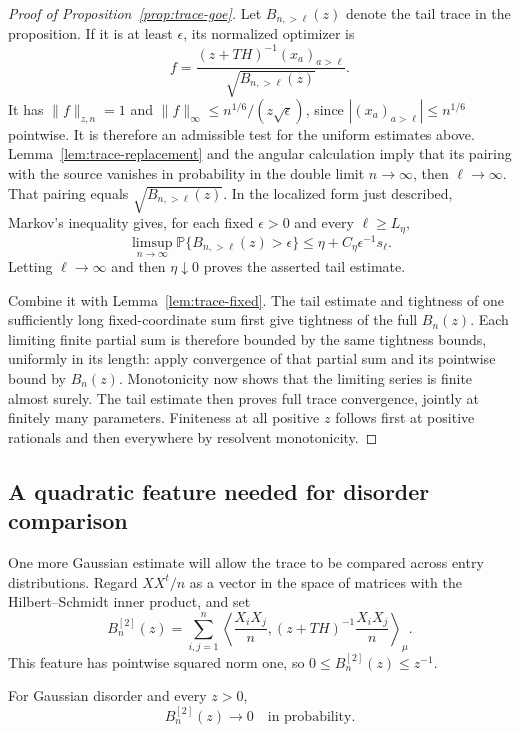 \begin{proof}[Proof of Proposition~\ref{prop:trace-goe}]
Let $B_{n,>\ell}(z)$ denote the tail trace in the proposition.  If it
is at least $\epsilon$, its normalized optimizer is
\[
 f=\frac{(z+TH)^{-1}(x_a)_{a>\ell}}{\sqrt{B_{n,>\ell}(z)}}.
\]
It has $\|f\|_{z,n}=1$ and
$\|f\|_\infty\leq n^{1/6}/(z\sqrt\epsilon)$, since
$|(x_a)_{a>\ell}|\leq n^{1/6}$ pointwise.  It is therefore an admissible
test for the uniform estimates above.  Lemma~\ref{lem:trace-replacement}
and the angular calculation imply that its pairing with the source
vanishes in probability in the double limit $n\to\infty$, then
$\ell\to\infty$.  That pairing equals $\sqrt{B_{n,>\ell}(z)}$.
In the localized form just described, Markov's inequality gives, for
each fixed $\epsilon>0$ and every $\ell\geq L_\eta$,
\[
 \limsup_{n\to\infty}
 \mathbb P\{B_{n,>\ell}(z)>\epsilon\}
 \leq\eta+C_\eta\epsilon^{-1}s_\ell.
\]
Letting $\ell\to\infty$ and then $\eta\downarrow0$ proves the asserted
tail estimate.

Combine it with Lemma~\ref{lem:trace-fixed}.  The tail estimate and
tightness of one sufficiently long fixed-coordinate sum first give
tightness of the full $B_n(z)$.  Each limiting finite partial sum is
therefore bounded by the same tightness bounds, uniformly in its
length: apply convergence of that partial sum and its pointwise bound
by $B_n(z)$.  Monotonicity now shows that the limiting series is finite
almost surely.  The tail estimate then proves full
trace convergence, jointly at finitely many parameters.  Finiteness at
all positive $z$ follows first at positive rationals and then everywhere
by resolvent monotonicity.
\end{proof}

\subsection{A quadratic feature needed for disorder comparison}

One more Gaussian estimate will allow the trace to be compared across
entry distributions.  Regard $XX^t/n$ as a vector in the space of
matrices with the Hilbert--Schmidt inner product, and set
\[
 B_n^{[2]}(z)=\sum_{i,j=1}^n
 \left\langle\frac{X_iX_j}{n},
 (z+TH)^{-1}\frac{X_iX_j}{n}\right\rangle_\mu.
\]
This feature has pointwise squared norm one, so
$0\leq B_n^{[2]}(z)\leq z^{-1}$.

\begin{proposition}
\label{prop:trace-second}
For Gaussian disorder and every $z>0$,
\begin{equation}
 B_n^{[2]}(z)\longrightarrow0
 \quad\text{in probability}.
 \label{eq:source-43}
\end{equation}
\end{proposition}

